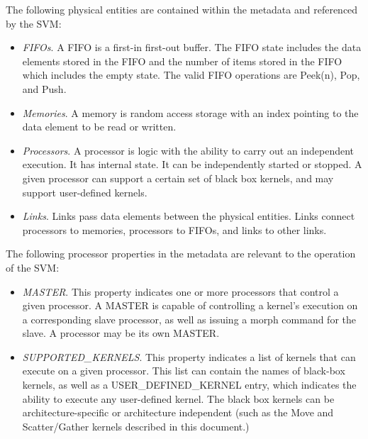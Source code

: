 
The following physical entities are contained within the metadata and referenced by
the SVM:

\begin{itemize}

\item {\it FIFOs}.  A FIFO is a first-in first-out buffer.  The FIFO
state includes the data elements stored in the FIFO and the number of
items stored in the FIFO which includes the empty state.  The valid
FIFO operations are Peek(n), Pop, and Push.

\item {\it Memories}. A memory is random access storage with an index
pointing to the data element to be read or written.

\item {\it Processors}. A processor is logic with the ability to carry
out an independent execution.  It has internal state.  It can be
independently started or stopped.  A given processor can support a
certain set of black box kernels, and may support user-defined
kernels.

\item {\it Links}. Links pass data elements between the physical
entities.  Links connect processors to memories, processors to FIFOs,
and links to other links.

\end{itemize}


The following processor properties in the metadata are relevant to the
operation of the SVM:

\begin{itemize}

\item {\it MASTER}.  This property indicates one or more processors
that control a given processor.  A MASTER is capable of controlling a
kernel's execution on a corresponding slave processor, as well as
issuing a morph command for the slave.  A processor may be its own
MASTER.

\item {\it SUPPORTED\_KERNELS}.  This property indicates a list of
kernels that can execute on a given processor.  This list can contain
the names of black-box kernels, as well as a USER\_DEFINED\_KERNEL
entry, which indicates the ability to execute any user-defined kernel.
The black box kernels can be architecture-specific or architecture
independent (such as the Move and Scatter/Gather kernels described in
this document.)

\end{itemize}

